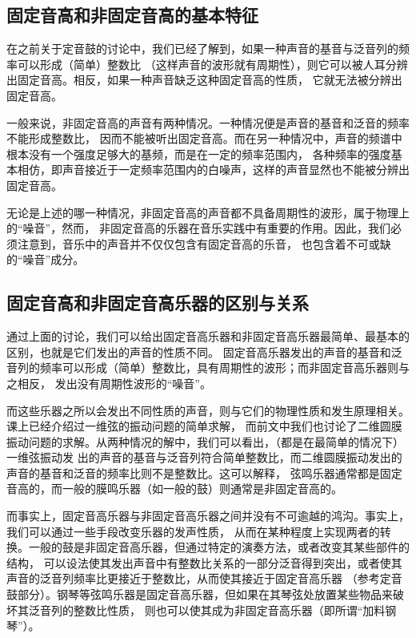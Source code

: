 \documentclass[a4paper]{ctexart}
\begin{document}
	\subsection{固定音高和非固定音高的基本特征}
	\par 
	在之前关于定音鼓的讨论中，我们已经了解到，如果一种声音的基音与泛音列的频率可以形成（简单）整数比
	（这样声音的波形就有周期性），则它可以被人耳分辨出固定音高。相反，如果一种声音缺乏这种固定音高的性质，
	它就无法被分辨出固定音高。
	\par
	一般来说，非固定音高的声音有两种情况。一种情况便是声音的基音和泛音的频率不能形成整数比，
	因而不能被听出固定音高。而在另一种情况中，声音的频谱中根本没有一个强度足够大的基频，而是在一定的频率范围内，
	各种频率的强度基本相仿，即声音接近于一定频率范围内的白噪声，这样的声音显然也不能被分辨出固定音高。
	\par
	无论是上述的哪一种情况，非固定音高的声音都不具备周期性的波形，属于物理上的“噪音”，然而，
	非固定音高的乐器在音乐实践中有重要的作用。因此，我们必须注意到，音乐中的声音并不仅仅包含有固定音高的乐音，
	也包含着不可或缺的“噪音”成分。
	\subsection{固定音高和非固定音高乐器的区别与关系}
	\par 
	通过上面的讨论，我们可以给出固定音高乐器和非固定音高乐器最简单、最基本的区别，也就是它们发出的声音的性质不同。
	固定音高乐器发出的声音的基音和泛音列的频率可以形成（简单）整数比，具有周期性的波形；而非固定音高乐器则与之相反，
	发出没有周期性波形的“噪音”。
	\par
	而这些乐器之所以会发出不同性质的声音，则与它们的物理性质和发生原理相关。课上已经介绍过一维弦的振动问题的简单求解，
	而前文中我们也讨论了二维圆膜振动问题的求解。从两种情况的解中，我们可以看出，（都是在最简单的情况下）一维弦振动发
	出的声音的基音与泛音列符合简单整数比，而二维圆膜振动发出的声音的基音和泛音的频率比则不是整数比。这可以解释，
	弦鸣乐器通常都是固定音高的，而一般的膜鸣乐器（如一般的鼓）则通常是非固定音高的。
	\par 
	而事实上，固定音高乐器与非固定音高乐器之间并没有不可逾越的鸿沟。事实上，我们可以通过一些手段改变乐器的发声性质，
	从而在某种程度上实现两者的转换。一般的鼓是非固定音高乐器，但通过特定的演奏方法，或者改变其某些部件的结构，
	可以设法使其发出声音中有整数比关系的一部分泛音得到突出，或者使其声音的泛音列频率比更接近于整数比，从而使其接近于固定音高乐器
	（参考定音鼓部分）。钢琴等弦鸣乐器是固定音高乐器，但如果在其琴弦处放置某些物品来破坏其泛音列的整数比性质，
	则也可以使其成为非固定音高乐器（即所谓“加料钢琴”）。
\end{document}

